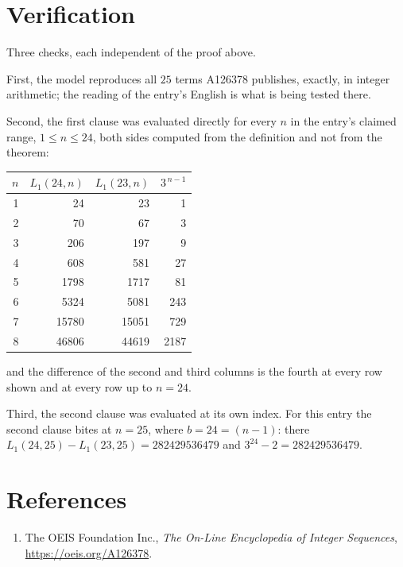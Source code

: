 \documentclass[11pt,a4paper]{article}
\theoremstyle{plain}
\theoremstyle{definition}
\begin{document}
\section{Verification}

Three checks, each independent of the proof above.

First, the model reproduces all $25$ terms A126378 publishes, exactly, in integer
arithmetic; the reading of the entry's English is what is being tested there.

Second, the first clause was evaluated directly for every $n$ in the entry's claimed range,
$1\le n\le24$, both sides computed from the definition and not from the theorem:

\begin{center}
\begin{tabular}{rrrr}
$n$ & $L_{1}(24,n)$ & $L_{1}(23,n)$ & $3^{\,n-1}$ \\ \hline
1 & 24 & 23 & 1 \\
2 & 70 & 67 & 3 \\
3 & 206 & 197 & 9 \\
4 & 608 & 581 & 27 \\
5 & 1798 & 1717 & 81 \\
6 & 5324 & 5081 & 243 \\
7 & 15780 & 15051 & 729 \\
8 & 46806 & 44619 & 2187 \\
\end{tabular}
\end{center}

\noindent and the difference of the second and third columns is the fourth at every row shown
and at every row up to $n=24$.

Third, the second clause was evaluated at its own index. For this entry the second clause bites at $n=25$, where $b=24=(n-1)$: there $L_{1}(24,25)-L_{1}(23,25)=282429536479$ and $3^{24}-2=282429536479$.

\section*{References}
\begin{enumerate}
\item The OEIS Foundation Inc., \emph{The On-Line Encyclopedia of Integer Sequences},
\url{https://oeis.org/A126378}.
\end{enumerate}
\end{document}
